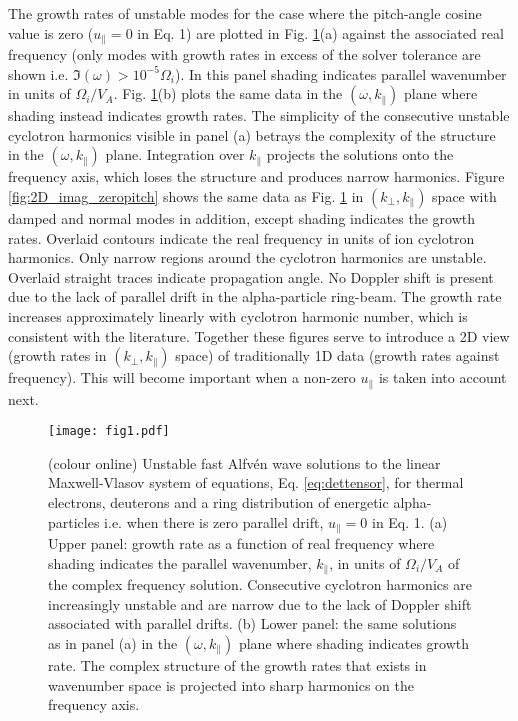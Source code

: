 \documentclass[12pt]{iopart}
\begin{document}
The growth rates of unstable modes for the case where the pitch-angle cosine
value is zero ($u_\parallel = 0$ in Eq. 1) are plotted in Fig.
\ref{fig:2D_F12_zeropitch}(a) against the associated real frequency (only modes
with growth rates in excess of the solver tolerance are shown i.e. $\Im(\omega)
> 10^{-5} \Omega_i$). In this panel shading indicates parallel wavenumber in
units of $\Omega_i/V_A$. Fig. \ref{fig:2D_F12_zeropitch}(b) plots the same data
in the $(\omega,k_\parallel)$ plane where shading instead indicates growth
rates. The simplicity of the consecutive unstable cyclotron harmonics visible in
panel (a) betrays the complexity of the structure in the $(\omega,k_\parallel)$
plane. Integration over $k_\parallel$ projects the solutions onto the frequency
axis, which loses the structure and produces narrow harmonics. Figure
\ref{fig:2D_imag_zeropitch} shows the same data as Fig.
\ref{fig:2D_F12_zeropitch} in $(k_\perp, k_\parallel)$ space with damped and
normal modes in addition, except shading indicates the growth rates. Overlaid
contours indicate the real frequency in units of ion cyclotron harmonics. Only
narrow regions around the cyclotron harmonics are unstable. Overlaid straight
traces indicate propagation angle. No Doppler shift is present due to the lack
of parallel drift in the alpha-particle ring-beam. The growth rate increases
approximately linearly with cyclotron harmonic number, which is consistent with
the literature\cite{Dendy1994}. Together these figures serve to introduce a 2D
view (growth rates in $(k_\perp, k_\parallel)$ space) of traditionally 1D data
(growth rates against frequency). This will become important when a non-zero
$u_\parallel$ is taken into account next.

\begin{figure}[ht!]
    \raggedleft
\texttt{[image: fig1.pdf]}
    \caption{(colour online) Unstable fast Alfv{\'e}n wave solutions to the
    linear Maxwell-Vlasov system of equations, Eq. \ref{eq:dettensor}, for
    thermal electrons, deuterons and a ring distribution of energetic
    alpha-particles i.e. when there is zero parallel drift, $u_\parallel=0$ in
    Eq. 1. (a) Upper panel: growth rate as a function of real frequency where shading
    indicates the parallel wavenumber, $k_\parallel$, in units of $\Omega_i/V_A$
    of the complex frequency solution. Consecutive cyclotron harmonics are
    increasingly unstable and are narrow due to the lack of Doppler shift 
    associated with parallel drifts. (b) Lower panel: the same solutions
    as in panel (a) in the $(\omega,k_\parallel)$ plane where shading indicates 
    growth rate. The complex structure of the growth rates that exists in
    wavenumber space is projected into sharp harmonics on the frequency axis.}
    \label{fig:2D_F12_zeropitch}
\end{figure}
\end{document}
